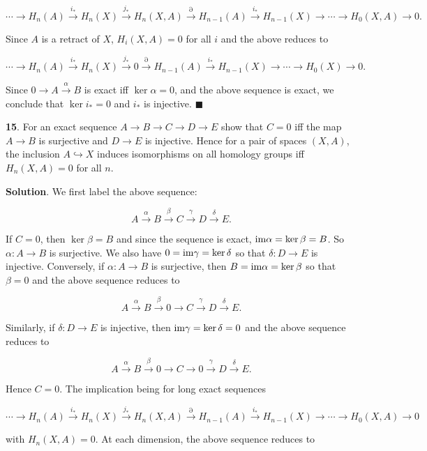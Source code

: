 \documentclass{article}
\newcommand{\im}{\textnormal{im}}
\begin{document}
$$\cdots \to H_{n}(A)\xrightarrow{i_{\ast}} H_{n}(X)\xrightarrow{j_{\ast}}H_{n}(X, A)\xrightarrow{\partial} H_{n-1}(A)\xrightarrow{i_{\ast}} H_{n-1}(X)\to \cdots \to H_{0}(X, A)\to 0.$$

Since $A$ is a retract of $X$, $H_{i}(X, A) = 0$ for all $i$ and the above reduces to

$$\cdots \to H_{n}(A)\xrightarrow{i_{\ast}} H_{n}(X)\xrightarrow{j_{\ast}}0\xrightarrow{\partial} H_{n-1}(A)\xrightarrow{i_{\ast}} H_{n-1}(X)\to \cdots \to H_{0}(X)\to 0.$$

Since $0\to A\xrightarrow{\alpha} B$ is exact iff $\ker \alpha = 0$, and the above sequence is exact, we conclude that $\ker i_{\ast} = 0$ and $i_{\ast}$ is injective. $\blacksquare$
\bigskip
\bigskip

\textbf{15}. For an exact sequence $A\to B\to C\to D\to E$ show that $C = 0$ iff the map $A\to B$ is surjective and $D\to E$ is injective. Hence for a pair of spaces $(X, A)$, the inclusion $A\hookrightarrow X$ induces isomorphisms on all homology groups iff $H_{n}(X, A) = 0$ for all $n$.
\medskip

\textbf{Solution}. We first label the above sequence:

$$A\xrightarrow{\alpha} B\xrightarrow{\beta} C\xrightarrow{\gamma} D\xrightarrow{\delta} E.$$

If $C = 0$, then $\ker \beta = B$ and since the sequence is exact, $\im \alpha = \ker \beta = B$. So $\alpha: A\to B$ is surjective. We also have $0 = \im \gamma = \ker \delta$ so that $\delta:D\to E$ is injective. Conversely, if $\alpha: A\to B$ is surjective, then $B = \im \alpha = \ker \beta$ so that $\beta = 0$ and the above sequence reduces to

$$A\xrightarrow{\alpha} B\xrightarrow{\beta} 0\to C\xrightarrow{\gamma} D\xrightarrow{\delta} E.$$

Similarly, if $\delta: D\to E$ is injective, then $\im \gamma = \ker \delta = 0$ and the above sequence reduces to

$$A\xrightarrow{\alpha} B\xrightarrow{\beta} 0\to C\to 0\xrightarrow{\gamma} D\xrightarrow{\delta} E.$$

Hence $C = 0$. The implication being for long exact sequences

$$\cdots \to H_{n}(A)\xrightarrow{i_{\ast}} H_{n}(X)\xrightarrow{j_{\ast}}H_{n}(X, A)\xrightarrow{\partial} H_{n-1}(A)\xrightarrow{i_{\ast}} H_{n-1}(X)\to \cdots \to H_{0}(X, A)\to 0$$

with $H_{n}(X, A) = 0$. At each dimension, the above sequence reduces to
\end{document}
